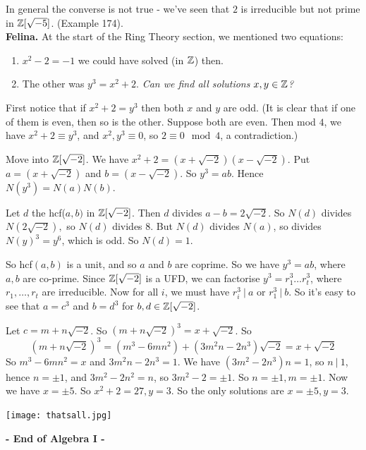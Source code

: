 \documentclass[twoside]{scrartcl}
\begin{document}
In general the converse is not true - we've seen that $2$ is irreducible but not prime in $\mathbb{Z}[\sqrt{-5}]$. (Example 174).\\

\textbf{Felina.} At the start of the Ring Theory section, we mentioned two equations:\begin{enumerate}

\item $x^2 -2 = -1$ we could have solved (in $\mathbb{Z}$) then.
 
\item  The other was $y^3 = x^2 + 2$. \textit{ Can we find all solutions $x,y \in \mathbb{Z}$?}
  \end{enumerate}\vspace*{5pt}
  
  First notice that if $x^2 +2 = y^3$ then both $x$ and $y$ are odd. (It is clear that if one of them is even, then so is the other. Suppose both are even. Then mod $4$, we have $x^2 + 2 \equiv y^3$, and $x^2,y^3 \equiv 0$, so $2 \equiv 0 \mod 4$, a contradiction.)
  
 Move into $\mathbb{Z}[\sqrt{-2}]$. We have $x^2 +2 = (x + \sqrt{-2})(x-\sqrt{-2})$. Put $a = (x+\sqrt{-2})$ and $b = (x-\sqrt{-2}).$ So $y^3 = ab$. Hence $N(y^3) = N(a)N(b).$
 
  Let $d$ the hcf($a,b)$ in $\mathbb{Z}[\sqrt{-2}]$. Then $d$ divides $a-b = 2\sqrt{-2}$. So $N(d)$ divides $N(2\sqrt{-2}),$ so $N(d) $ divides $8$. But $N(d)$ divides $N(a)$, so divides $N(y)^3 = y^6$, which is odd. So $N(d) = 1$.
 
  So hcf$(a,b)$ is a unit, and so $a$ and $b$ are coprime. So we have $y^3 = ab$, where $a,b$ are co-prime. Since $\mathbb{Z}[\sqrt{-2}]$ is a UFD, we can factorise $y^3 = r_1^3 \dots r_t^3$, where $r_1,\dots,r_t$ are irreducible. Now for all $i$, we must have $r_i^3 ~|~ a$ or $r_1^3 ~|~ b$. So it's easy to see that $a=c^3$ and $b = d^3$ for $b,d \in \mathbb{Z}[\sqrt{-2}]$. 
  
  Let $c = m+n\sqrt{-2}$. So $(m + n\sqrt{-2})^3 = x + \sqrt{-2}$. So
  \[(m + n\sqrt{-2})^3  = (m^3 -6mn^2) + (3m^2n-2n^3)\sqrt{-2} = x+\sqrt{-2}\]
  So $m^3 - 6mn^2 = x$ and $3m^2n - 2n^3 = 1$. We have $(3m^2 - 2n^3)n = 1$, so $n~|~1$, hence $n = \pm 1$, and $3m^2 - 2n^2 = n$, so $3m^2 - 2 =\pm 1$. So $n = \pm 1, m = \pm 1$. Now we have $x = \pm 5$. So $x^2 + 2 = 27, y = 3$. So the only solutions are $x = \pm 5, y = 3$.\\
  
  
  \begin{center}
    \texttt{[image: thatsall.jpg]}
   \vspace*{20pt}
   
  \textsf{\textbf{- End of Algebra I -}}	
  \end{center}


 
\end{document}

